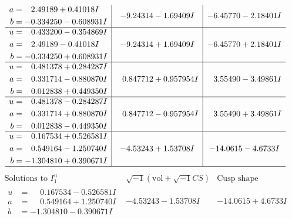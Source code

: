 \documentclass[1p]{elsarticle_modified}
\theoremstyle{definition}
\newcommand{\I}{\sqrt{-1}}
\begin{document}
$$\begin{array}{c|c|c}
\begin{aligned}
a &= \phantom{-}2.49189 + 0.41018 I \\
b &= -0.334250 - 0.608931 I\end{aligned}
 & -9.24314 - 1.69409 I & -6.45770 - 2.18401 I \\ \hline\begin{aligned}
u &= \phantom{-}0.433200 - 0.354869 I \\
a &= \phantom{-}2.49189 - 0.41018 I \\
b &= -0.334250 + 0.608931 I\end{aligned}
 & -9.24314 + 1.69409 I & -6.45770 + 2.18401 I \\ \hline\begin{aligned}
u &= \phantom{-}0.481378 + 0.284287 I \\
a &= \phantom{-}0.331714 - 0.880870 I \\
b &= \phantom{-}0.012838 + 0.449350 I\end{aligned}
 & \phantom{-}0.847712 + 0.957954 I & \phantom{-}3.55490 - 3.49861 I \\ \hline\begin{aligned}
u &= \phantom{-}0.481378 - 0.284287 I \\
a &= \phantom{-}0.331714 + 0.880870 I \\
b &= \phantom{-}0.012838 - 0.449350 I\end{aligned}
 & \phantom{-}0.847712 - 0.957954 I & \phantom{-}3.55490 + 3.49861 I \\ \hline\begin{aligned}
u &= \phantom{-}0.167534 + 0.526581 I \\
a &= \phantom{-}0.549164 - 1.250740 I \\
b &= -1.304810 + 0.390671 I\end{aligned}
 & -4.53243 + 1.53708 I & -14.0615 - 4.6733 I\\
 \hline 
 \end{array}$$\newpage$$\begin{array}{c|c|c}  
\text{Solutions to }I^u_{1}& \I (\text{vol} + \sqrt{-1}CS) & \text{Cusp shape}\\
 \hline 
\begin{aligned}
u &= \phantom{-}0.167534 - 0.526581 I \\
a &= \phantom{-}0.549164 + 1.250740 I \\
b &= -1.304810 - 0.390671 I\end{aligned}
 & -4.53243 - 1.53708 I & -14.0615 + 4.6733 I \\ \hline\begin{aligned}

\end{aligned}
\end{array}$$
\end{document}
